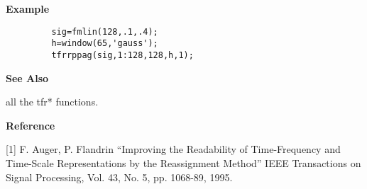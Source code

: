 
{\bf \large \sf Example}
\begin{verbatim}
         sig=fmlin(128,.1,.4);
         h=window(65,'gauss'); 
         tfrrppag(sig,1:128,128,h,1);
\end{verbatim}
\vspace*{.5cm}


{\bf \large \sf See Also}\\
\hspace*{1.5cm}
\begin{minipage}[t]{13.5cm}
all the {\ty tfr*} functions.
\end{minipage}
\vspace*{.5cm}


{\bf \large \sf Reference}\\
\hspace*{1.5cm}
\begin{minipage}[t]{13.5cm}
[1] F. Auger, P. Flandrin ``Improving the Readability of Time-Frequency and
Time-Scale Representations by the Reassignment Method'' IEEE Transactions
on Signal Processing, Vol. 43, No. 5, pp. 1068-89, 1995.
\end{minipage}

